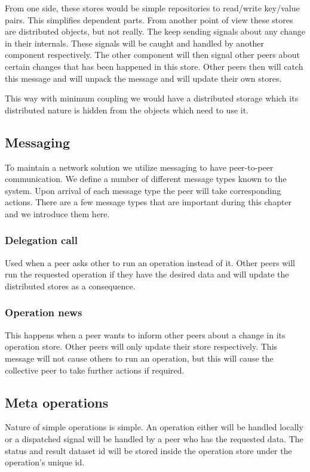 From one side, these stores would be simple repositories to read/write key/value pairs.
This simplifies dependent parts.
From another point of view these stores are distributed objects, but not really.
The keep sending signals about any change in their internals.
These signals will be caught and handled by another component respectively.
The other component will then signal other peers about certain changes that has been happened in this store.
Other peers then will catch this message and will unpack the message and will update their own stores.

This way with minimum coupling we would have a distributed storage which its distributed nature is hidden from
the objects which need to use it.

\subsection{Messaging}
To maintain a network solution we utilize messaging to have peer-to-peer communication. 
We define a number of different message types known to the system. 
Upon arrival of each message type the peer will take corresponding actions.
There are a few message types that are important during this chapter and we introduce them here.

\subsubsection{Delegation call}
Used when a peer asks other to run an operation instead of it.
Other peers will run the requested operation if they have the desired data and will update
the distributed stores as a consequence.

\subsubsection{Operation news}
This happens when a peer wants to inform other peers about a change in its operation store.
Other peers will only update their store respectively.
This message will not cause others to run an operation, 
but this will cause the collective peer to take further actions if required.

\subsection{Meta operations}
Nature of simple operations is simple. 
An operation either will be handled locally or a dispatched signal will be handled
by a peer who has the requested data. 
The status and result dataset id will be stored inside the operation store under the operation's unique id.

